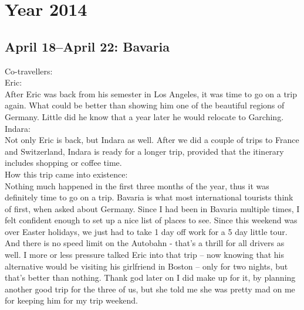 \chapter{Year 2014}
\label{2014}

\section{April 18--April 22: Bavaria}
\label{2014:Germany}

Co-travellers: \\
Eric:\\
After Eric was back from his semester in Los Angeles, it was time to go on a trip again. What could be better than showing him one of the beautiful regions of Germany. Little did he know that a year later he would relocate to Garching.\\

Indara:\\
Not only Eric is back, but Indara as well. After we did a couple of trips to France and Switzerland, Indara is ready for a longer trip, provided that the itinerary includes shopping or coffee time.\\

How this trip came into existence:\\
Nothing much happened in the first three months of the year, thus it was definitely time to go on a trip. Bavaria is what most international tourists think of first, when asked about Germany. Since I had been in Bavaria multiple times, I felt confident enough to set up a nice list of places to see. Since this weekend was over Easter holidays, we just had to take 1 day off work for a 5 day little tour. And there is no speed limit on the Autobahn - that's a thrill for all drivers as well. I more or less pressure talked Eric into that trip -- now knowing that his alternative would be visiting his girlfriend in Boston -- only for two nights, but that's better than nothing. Thank god later on I did make up for it, by planning another good trip for the three of us, but she told me she was pretty mad on me for keeping him for my trip weekend.\\

